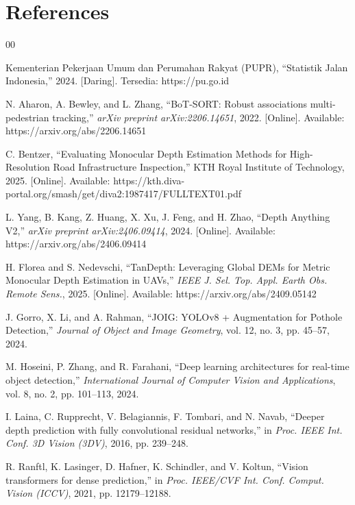 \documentclass{iopjournal}
\begin{document}
\section*{References}
\begin{thebibliography}{00}

Kementerian Pekerjaan Umum dan Perumahan Rakyat (PUPR), ``Statistik Jalan Indonesia,'' 2024. [Daring]. Tersedia: https://pu.go.id

N. Aharon, A. Bewley, and L. Zhang, ``BoT-SORT: Robust associations multi-pedestrian tracking,'' \emph{arXiv preprint arXiv:2206.14651}, 2022. [Online]. Available: https://arxiv.org/abs/2206.14651

C. Bentzer, ``Evaluating Monocular Depth Estimation Methods for High-Resolution Road Infrastructure Inspection,'' KTH Royal Institute of Technology, 2025. [Online]. Available: https://kth.diva-portal.org/smash/get/diva2:1987417/FULLTEXT01.pdf

L. Yang, B. Kang, Z. Huang, X. Xu, J. Feng, and H. Zhao, ``Depth Anything V2,'' \emph{arXiv preprint arXiv:2406.09414}, 2024. [Online]. Available: https://arxiv.org/abs/2406.09414

H. Florea and S. Nedevschi, ``TanDepth: Leveraging Global DEMs for Metric Monocular Depth Estimation in UAVs,'' \emph{IEEE J. Sel. Top. Appl. Earth Obs. Remote Sens.}, 2025. [Online]. Available: https://arxiv.org/abs/2409.05142

J. Gorro, X. Li, and A. Rahman, ``JOIG: YOLOv8 + Augmentation for Pothole Detection,'' \emph{Journal of Object and Image Geometry}, vol. 12, no. 3, pp. 45--57, 2024.

M. Hoseini, P. Zhang, and R. Farahani, ``Deep learning architectures for real-time object detection,'' \emph{International Journal of Computer Vision and Applications}, vol. 8, no. 2, pp. 101--113, 2024.

I. Laina, C. Rupprecht, V. Belagiannis, F. Tombari, and N. Navab, ``Deeper depth prediction with fully convolutional residual networks,'' in \emph{Proc. IEEE Int. Conf. 3D Vision (3DV)}, 2016, pp. 239--248.

R. Ranftl, K. Lasinger, D. Hafner, K. Schindler, and V. Koltun, ``Vision transformers for dense prediction,'' in \emph{Proc. IEEE/CVF Int. Conf. Comput. Vision (ICCV)}, 2021, pp. 12179--12188.


\end{thebibliography}
\end{document}
